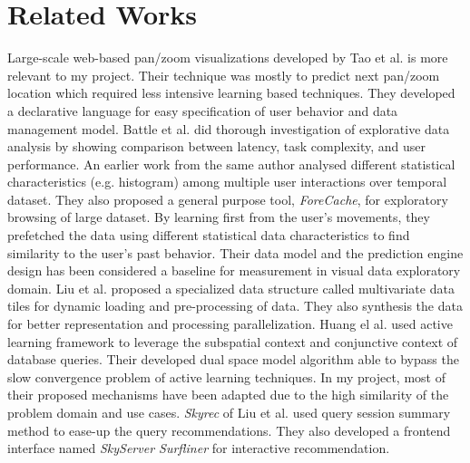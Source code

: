 \section{Related Works}
\label{sec:background}
Large-scale web-based pan/zoom visualizations developed by Tao et al.\cite{tao2019kyrix} is more relevant to my project. Their technique was mostly to
predict next pan/zoom location which required less intensive learning based techniques. They developed a declarative language for easy specification of user
behavior and data management model. Battle et al.\cite{battle2019role} did thorough investigation of explorative data analysis by showing comparison between
latency, task complexity, and user performance. An earlier work\cite{battle2014dynamic} from the same author analysed different statistical characteristics
(e.g. histogram) among multiple user interactions over temporal dataset. They also proposed a general purpose tool, \emph{ForeCache}\cite{battle2016dynamic},
for exploratory browsing of large dataset. By learning first from the user's movements, they prefetched the data using different statistical data
characteristics to find similarity to the user's past behavior. Their data model and the prediction engine design has been considered a baseline for
measurement in visual data exploratory domain. Liu et al.\cite{liu2013immens} proposed a specialized data structure called multivariate data tiles for
dynamic loading and pre-processing of data. They also synthesis the data for better representation and processing parallelization. Huang el al.
\cite{huang2018optimization} used active learning framework to leverage the subspatial context and conjunctive context of database queries. Their developed
dual space model algorithm able to bypass the slow convergence problem of active learning techniques. In my project, most of their proposed mechanisms have
been adapted due to the high similarity of the problem domain and use cases. \emph{Skyrec}\cite{liu2019improvement} of Liu et al. used query session summary
method to ease-up the query recommendations. They also developed a frontend interface named \emph{SkyServer Surfliner} for interactive recommendation.